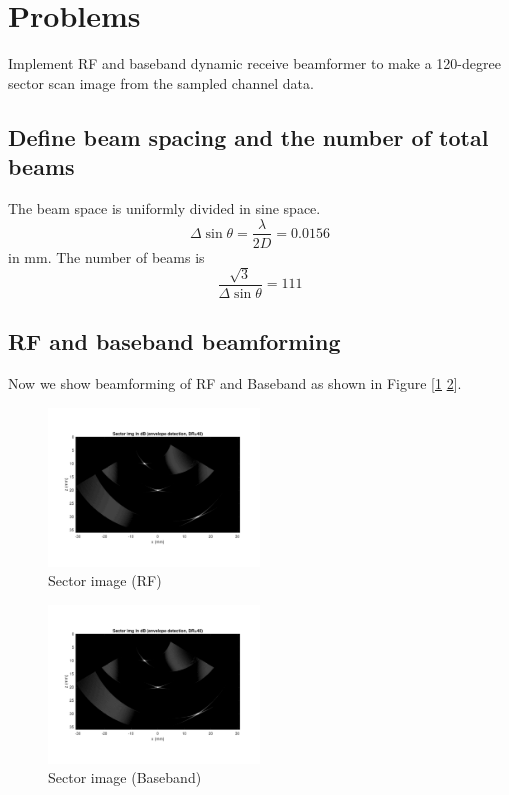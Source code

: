 \documentclass{article}
\begin{document}
\section{Problems}
Implement RF and baseband dynamic receive beamformer to make a 120-degree sector scan image from the sampled channel data.

\subsection{Define beam spacing and the number of total beams}
The beam space is uniformly divided in sine space.
$$
    \Delta \sin\theta = \frac{\lambda}{2D} = 0.0156
$$
in mm. The number of beams is
$$
    \frac{\sqrt{3}}{\Delta \sin\theta} = 111
$$

\subsection{RF and baseband beamforming}
Now we show beamforming of RF and Baseband as shown in Figure [\ref{fig:RF-b-9} \ref{fig:Base-b-6}].
\begin{figure}[H]
    \centering
    \includegraphics[width=0.5\textwidth]{src/RF/b-9.pdf}
    \caption{Sector image (RF)}
    \label{fig:RF-b-9}
\end{figure}
\begin{figure}[H]
    \centering
    \includegraphics[width=0.5\textwidth]{src/Base/b-6.pdf}
    \caption{Sector image (Baseband)}
    \label{fig:Base-b-6}
\end{figure}
\end{document}

